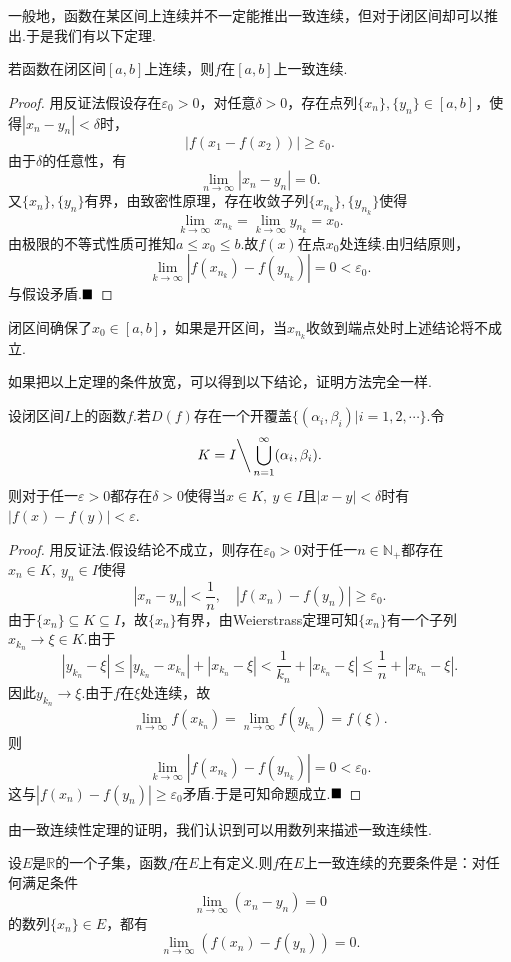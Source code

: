 一般地，函数在某区间上连续并不一定能推出一致连续，但对于闭区间却可以推出.于是我们有以下定理.
\begin{theorem}
	若函数在闭区间$\left[a,b\right]$上连续，则$f$在$\left[a,b\right]$上一致连续.
\end{theorem}
\begin{proof}
	用反证法\qquad 假设存在$\varepsilon_0>0$，对任意$\delta>0$，存在点列$\{x_n\},\{y_n\}\in \left[a,b\right]$，使得$|x_n-y_n|<\delta$时，
	$$|f(x_1-f(x_2))|\geqslant\varepsilon_0.$$
	由于$\delta$的任意性，有
	$$\lim\limits_{n\to\infty}|x_n-y_n|=0.$$
	又$\{x_n\},\{y_n\}$有界，由致密性原理，存在收敛子列$\{x_{n_k}\},\{y_{n_k}\}$使得
	$$\lim\limits_{k\to\infty}x_{n_k}=\lim\limits_{k\to\infty}y_{n_k}=x_0.$$
	由极限的不等式性质可推知$a\leqslant x_0\leqslant b$.故$f(x)$在点$x_0$处连续.由归结原则，
	$$\lim\limits_{k\to\infty}|f(x_{n_k})-f(y_{n_k})|=0<\varepsilon_0.$$
	与假设矛盾.$\hfill\blacksquare$
\end{proof}
\begin{remark}
	闭区间确保了$x_0\in\left[a,b\right]$，如果是开区间，当$x_{n_k}$收敛到端点处时上述结论将不成立.
\end{remark}
如果把以上定理的条件放宽，可以得到以下结论，证明方法完全一样.
\begin{proposition}\label{prop:biji}
	设闭区间$I$上的函数$f$.若$D(f)$存在一个开覆盖$\{(\alpha_i,\beta_i)|i=1,2,\cdots\}$.令
	$$K=I\bigg\backslash\bigcup_{n=1}^{\infty}(\alpha_i,\beta_i).$$
	则对于任一$\varepsilon>0$都存在$\delta>0$使得当$x\in K,\ y\in I$且$|x-y|<\delta$时有$|f(x)-f(y)|<\varepsilon$.
\end{proposition}
\begin{proof}
	用反证法.假设结论不成立，则存在$\varepsilon_0>0$对于任一$n\in\mathbb{N}_+$都存在$x_n\in K,\ y_n\in I$使得
	$$|x_n-y_n|<\frac{1}{n},\quad |f(x_n)-f(y_n)|\geqslant\varepsilon_0.$$
	由于$\{x_n\}\subseteq K\subseteq I$，故$\{x_n\}$有界，由Weierstrass定理可知$\{x_n\}$有一个子列$x_{k_n}\to \xi\in K$.由于
	$$|y_{k_n}-\xi|\leqslant|y_{k_n}-x_{k_n}|+|x_{k_n}-\xi|<\frac{1}{k_n}+|x_{k_n}-\xi|\leqslant\frac{1}{n}+|x_{k_n}-\xi|.$$
	因此$y_{k_n}\to\xi$.由于$f$在$\xi$处连续，故
	$$\lim\limits_{n\to\infty}f(x_{k_n})=\lim\limits_{n\to\infty}f(y_{k_n})=f(\xi).$$
	则
	$$\lim\limits_{k\to\infty}|f(x_{n_k})-f(y_{n_k})|=0<\varepsilon_0.$$
	这与$|f(x_n)-f(y_n)|\geqslant\varepsilon_0$矛盾.于是可知命题成立.$\hfill\blacksquare$
\end{proof}
由一致连续性定理的证明，我们认识到可以用数列来描述一致连续性.
\begin{theorem}[一致连续性的数列式描述]
	设$E$是$\mathbb{R}$的一个子集，函数$f$在$E$上有定义.则$f$在$E$上一致连续的充要条件是：对任何满足条件$$\lim\limits_{n\to\infty}(x_n-y_n)=0$$
	的数列$\{x_n\}\in E$，都有$$\lim\limits_{n\to\infty}(f(x_n)-f(y_n))=0.$$
\end{theorem}

